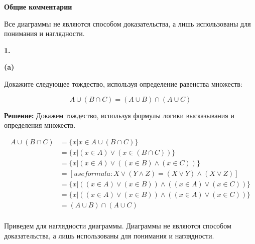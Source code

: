 \documentclass{article}
\begin{document}
\textbf{Общие комментарии}

Все диаграммы не являются способом доказательства, а лишь использованы для понимания и наглядности. 

\textbf{1.}

\textbf{(a)}

Докажите следующее тождество, используя определение равенства множеств:

$$A \cup (B \cap C) = (A \cup B) \cap (A \cup C)$$

\textbf{Решение:}
Докажем тождество, используя формулы логики высказывания и определения множеств. 

\begin{equation} 
\begin{split}
A \cup (B \cap C) & = \{x | x \in A \cup (B \cap C) \} \\
 & = \{x | (x \in A) \vee (x \in (B \cap C)) \} \\
 & = \{x | (x \in A) \vee ( (x \in B) \wedge (x \in C)) \} \\
 & = [ use formula: X \vee (Y \wedge Z) = (X \vee Y) \wedge (X \vee Z)]  \\ 
 & = \{x | ((x \in A) \vee (x \in B)) \wedge ((x \in A) \vee (x \in C)) \} \\
 & = \{x | ((x \in A) \vee (x \in B)) \wedge ((x \in A) \vee (x \in C)) \} \\
 & = (A \cup B) \cap (A \cup C) \\
\end{split}
\end{equation}

Приведем для наглядности диаграммы. Диаграммы не являются способом доказательства, а лишь использованы для понимания и наглядности. 
\end{document}
